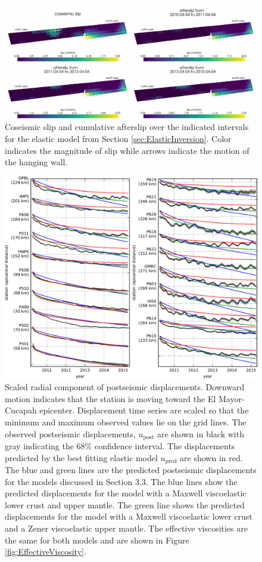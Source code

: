 \documentclass[draft,linenumbers]{AGUJournal}
\begin{document}
\begin{figure}
\includegraphics[scale=0.9]{Figures/ElasticSlip}
\caption{Coseismic slip and cumulative afterslip over the indicated intervals for the elastic model from Section \ref{sec:ElasticInversion}.  Color indicates the magnitude of slip while arrows indicate the motion of the hanging wall.}
\label{fig:ElasticSlip}
\end{figure}

\begin{figure}
\includegraphics[scale=0.9]{Figures/RecordSectionFinal}
\caption{Scaled radial component of postseismic displacements. Downward motion indicates that the station is moving toward the El Mayor-Cucapah epicenter.  Displacement time series are scaled so that the minimum and maximum observed values lie on the grid lines.  The observed postseismic displacements, $u_\mathrm{post}$ are shown in black with gray indicating the 68\% confidence interval.  The displacements predicted by the best fitting elastic model $u_\mathrm{pred}$ are shown in red.  The blue and green lines are the predicted postseismic displacements for the models discussed in Section 3.3. The blue lines show the predicted displacements for the model with a Maxwell viscoelastic lower crust and upper mantle.  The green line shows the predicted displacements for the model with a Maxwell viscoelastic lower crust and a Zener viscoelastic upper mantle.  The effective viscosities are the same for both models and are shown in Figure \ref{fig:EffectiveViscosity}.}
\label{fig:RecordSectionMain}
\end{figure}
\end{document}
